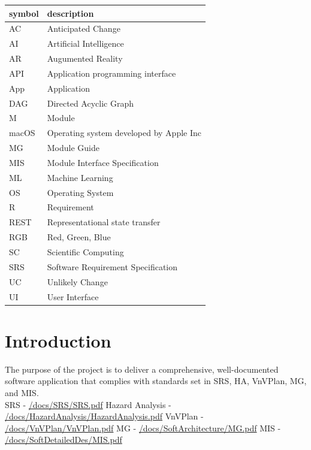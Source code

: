 \documentclass[12pt, titlepage]{article}
\begin{document}
\renewcommand{\arraystretch}{1.2}
\begin{tabular}{l l} 
  \toprule		
  \textbf{symbol} & \textbf{description}\\
  \midrule 
  AC & Anticipated Change\\
  AI & Artificial Intelligence \\
  AR & Augumented Reality \\
  API & Application programming interface\\
  App & Application \\
  DAG & Directed Acyclic Graph \\
  M & Module \\
  macOS & Operating system developed by Apple Inc \\
  MG & Module Guide \\
  MIS & Module Interface Specification \\
  ML & Machine Learning \\
  OS & Operating System \\
  R & Requirement\\
  REST & Representational state transfer\\
  RGB & Red, Green, Blue \\
  SC & Scientific Computing \\
  SRS & Software Requirement Specification \\
  UC & Unlikely Change \\
  UI & User Interface\\
  \bottomrule
\end{tabular}

\newpage

\tableofcontents

\newpage

\listoftables

\listoffigures

\newpage


\section{Introduction}
The purpose of the project is to deliver a comprehensive, well-documented software application that complies with standards set in SRS, HA, VnVPlan, MG, and MIS.
\\
\newline
SRS - \href{https://github.com/marlon4dashen/Hairesthetics/blob/main/docs/SRS/SRS.pdf}{/docs/SRS/SRS.pdf}
\newline
Hazard Analysis - \href{https://github.com/marlon4dashen/Hairesthetics/blob/main/docs/HazardAnalysis/HazardAnalysis.pdf}{/docs/HazardAnalysis/HazardAnalysis.pdf}
\newline
VnVPlan - \href{https://github.com/marlon4dashen/Hairesthetics/blob/main/docs/VnVPlan/VnVPlan.pdf}{/docs/VnVPlan/VnVPlan.pdf}
\newline
MG - \href{https://github.com/marlon4dashen/Hairesthetics/blob/main/docs/Design/SoftArchitecture/MG.pdf}{/docs/SoftArchitecture/MG.pdf}
\newline
MIS - \href{https://github.com/marlon4dashen/Hairesthetics/blob/main/docs/Design/SoftDetailedDes/MIS.pdf}{/docs/SoftDetailedDes/MIS.pdf}
\end{document}
